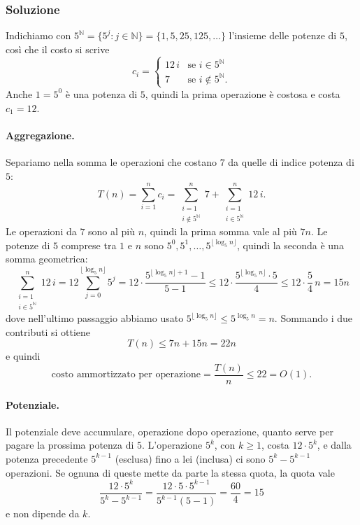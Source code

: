 \subsubsection*{Soluzione}
Indichiamo con $5^{\mathbb{N}} = \{5^j : j \in \mathbb{N}\} = \{1, 5, 25, 125, \dots\}$ l'insieme delle potenze di $5$, così che il costo si scrive
\[
c_i =
\begin{cases}
    12\,i & \text{se } i \in 5^{\mathbb{N}} \\
    7 & \text{se } i \notin 5^{\mathbb{N}}.
\end{cases}
\]
Anche $1 = 5^0$ è una potenza di $5$, quindi la prima operazione è costosa e costa $c_1 = 12$.

\paragraph{Aggregazione.}
Separiamo nella somma le operazioni che costano $7$ da quelle di indice potenza di $5$:
\[
T(n) = \sum_{i=1}^{n} c_i = \sum_{\substack{i=1 \\ i \notin 5^{\mathbb{N}}}}^{n} 7 + \sum_{\substack{i=1 \\ i \in 5^{\mathbb{N}}}}^{n} 12\,i.
\]
Le operazioni da $7$ sono al più $n$, quindi la prima somma vale al più $7n$. Le potenze di $5$ comprese tra $1$ e $n$ sono $5^0, 5^1, \dots, 5^{\lfloor \log_5 n \rfloor}$, quindi la seconda è una somma geometrica:
\[
\sum_{\substack{i=1 \\ i \in 5^{\mathbb{N}}}}^{n} 12\,i = 12 \sum_{j=0}^{\lfloor \log_5 n \rfloor} 5^j = 12 \cdot \frac{5^{\lfloor \log_5 n \rfloor + 1} - 1}{5 - 1} \le 12 \cdot \frac{5^{\lfloor \log_5 n \rfloor} \cdot 5}{4} \le 12 \cdot \frac{5}{4}\,n = 15n
\]
dove nell'ultimo passaggio abbiamo usato $5^{\lfloor \log_5 n \rfloor} \le 5^{\log_5 n} = n$. Sommando i due contributi si ottiene
\[
T(n) \le 7n + 15n = 22n
\]
e quindi
\[
\text{costo ammortizzato per operazione} = \frac{T(n)}{n} \le 22 = O(1).
\]

\paragraph{Potenziale.}
Il potenziale deve accumulare, operazione dopo operazione, quanto serve per pagare la prossima potenza di $5$. L'operazione $5^k$, con $k \ge 1$, costa $12 \cdot 5^k$, e dalla potenza precedente $5^{k-1}$ (esclusa) fino a lei (inclusa) ci sono $5^k - 5^{k-1}$ operazioni. Se ognuna di queste mette da parte la stessa quota, la quota vale
\[
\frac{12 \cdot 5^k}{5^k - 5^{k-1}} = \frac{12 \cdot 5 \cdot 5^{k-1}}{5^{k-1}(5 - 1)} = \frac{60}{4} = 15
\]
e non dipende da $k$.


